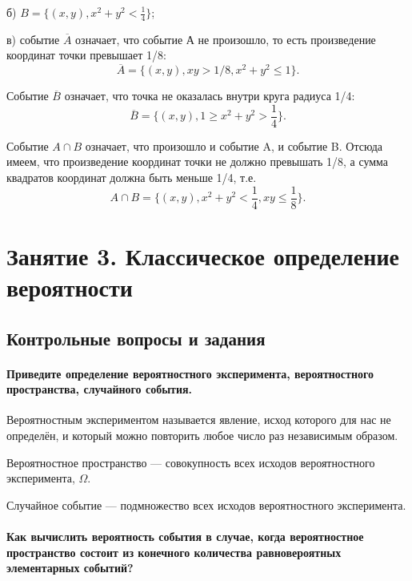 \documentclass{book}
\begin{document}
б) $ B =
\{ (x, y), x^2 + y^2 < \frac{ 1 }{ 4 } \} $;

в) событие $ \overline{ A } $ означает, что событие А не произошло, то есть произведение координат точки превышает 1/8:
$$ \overline{ A } =
\{ (x, y), xy > 1/8, x^2 + y^2 \leq 1 \}.$$

Событие $ \overline{ B } $ означает, что точка не оказалась внутри круга радиуса 1/4:
$$ \overline{ B } =
\{ (x, y), 1 \geq x^2 + y^2 > \frac{ 1 }{ 4 } \}.$$

Событие $ A \cap B $ означает, что произошло и событие A, и событие B.
Отсюда имеем, что произведение координат точки не должно превышать 1/8, а сумма квадратов координат должна быть меньше 1/4, т.е.
$$ A \cap B =
\{ (x, y), x^2 + y^2 < \frac{ 1 }{ 4 }, xy \leq \frac{ 1 }{ 8 } \}.$$

\chapter*{Занятие 3. Классическое определение вероятности}

\section*{Контрольные вопросы и задания}

\subsubsection*{Приведите определение вероятностного эксперимента, вероятностного пространства, случайного события.}

Вероятностным экспериментом называется явление, исход которого для нас не определён, и который можно повторить любое число раз независимым образом.

Вероятностное пространство --- совокупность всех исходов вероятностного эксперимента, $\Omega$.

Случайное событие --- подмножество всех исходов вероятностного эксперимента.

\subsubsection*{Как вычислить вероятность события в случае, когда вероятностное пространство состоит из конечного количества равновероятных элементарных событий?}
\end{document}
